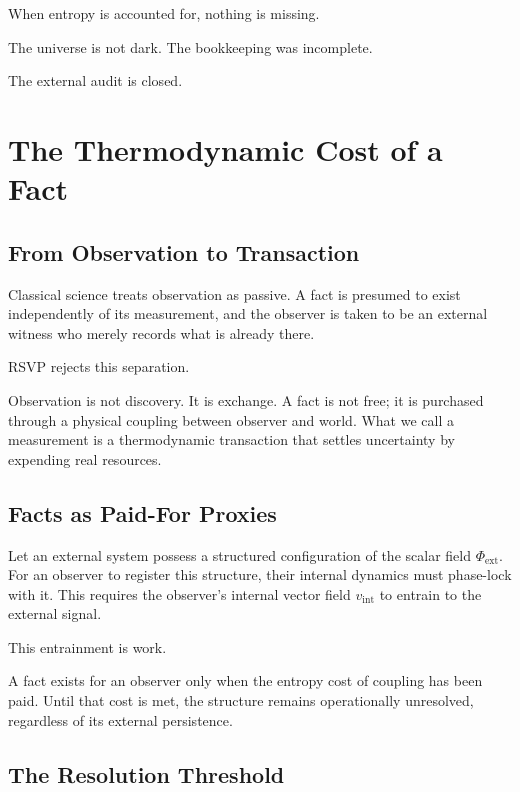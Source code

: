 \documentclass[11pt]{book}
\begin{document}
When entropy is accounted for, nothing is missing.

The universe is not dark.
The bookkeeping was incomplete.

The external audit is closed.


\chapter{The Thermodynamic Cost of a Fact}

\section{From Observation to Transaction}

Classical science treats observation as passive. A fact is presumed to exist independently of its measurement, and the observer is taken to be an external witness who merely records what is already there.

RSVP rejects this separation.

Observation is not discovery. It is exchange. A fact is not free; it is purchased through a physical coupling between observer and world. What we call a measurement is a thermodynamic transaction that settles uncertainty by expending real resources.

\section{Facts as Paid-For Proxies}

Let an external system possess a structured configuration of the scalar field \(\Phi_{\text{ext}}\). For an observer to register this structure, their internal dynamics must phase-lock with it. This requires the observer’s internal vector field \(v_{\text{int}}\) to entrain to the external signal.

This entrainment is work.

A fact exists for an observer only when the entropy cost of coupling has been paid. Until that cost is met, the structure remains operationally unresolved, regardless of its external persistence.

\section{The Resolution Threshold}
\end{document}
